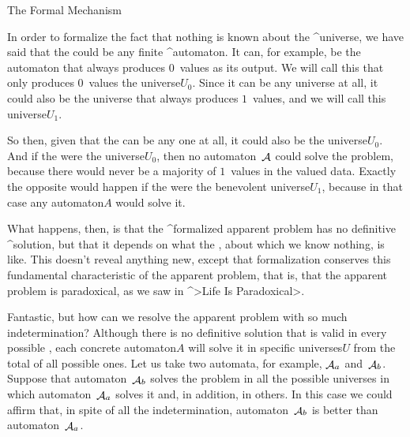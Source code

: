 \Section The Formal Mechanism

In order to formalize the fact that nothing is known about the
^{universe}, we have said that the {\universe} could be any finite
^{automaton}. It can, for example, be the automaton that always produces
$0$~values as its output. We will call this {\universe} that only
produces $0$~values the \corporal universe$U_0$. Since it can be any
universe at all, it could also be the universe that always produces
$1$~values, and we will call this \corporal universe$U_1$.

So then, given that the {\universe} can be any one at all, it could also
be the \corporal universe$U_0$. And if the {\universe} were the
\corporal universe$U_0$, then no automaton~$\aut A$ could solve the
problem, because there would never be a majority of $1$~values in the
valued data. Exactly the opposite would happen if the {\universe} were
the benevolent \corporal universe$U_1$, because in that case any
\corporal automaton$A$ would solve it.

What happens, then, is that the ^{formalized apparent problem} has no
definitive ^{solution}, but that it depends on what the {\universe},
about which we know nothing, is like. This doesn't reveal anything new,
except that formalization conserves this fundamental characteristic of
the apparent problem, that is, that the apparent problem is paradoxical,
as we saw in ^>Life Is Paradoxical>.

Fantastic, but how can we resolve the apparent problem with so much
indetermination? Although there is no definitive solution that is valid
in every possible {\universe}, each concrete \corporal automaton$A$ will
solve it in specific \corporal universes$U$ from the total of all
possible ones. Let us take two automata, for example, $\aut A_a$
and~$\aut A_b$. Suppose that automaton~$\aut A_b$ solves the problem in
all the possible universes in which automaton~$\aut A_a$ solves it and,
in addition, in others. In this case we could affirm that, in spite of
all the indetermination, automaton~$\aut A_b$ is better than
automaton~$\aut A_a$.

